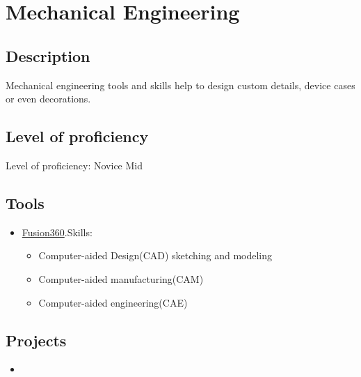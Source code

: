 \section{Mechanical Engineering}

\subsection{Description}

Mechanical engineering tools and skills help to design custom details,
device cases or even decorations.

\subsection{Level of proficiency}

Level of proficiency: Novice Mid

\subsection{Tools}

\begin{itemize}
    \item \href{https://www.autodesk.com/products/fusion-360/overview}{Fusion360}.\break Skills:
    \begin{itemize}
        \item Computer-aided Design(CAD) sketching and modeling
        \item Computer-aided manufacturing(CAM)
        \item Computer-aided engineering(CAE)
    \end{itemize}
\end{itemize}

\subsection{Projects}

\begin{itemize}
    \item \noprojects
\end{itemize}

\newpage
